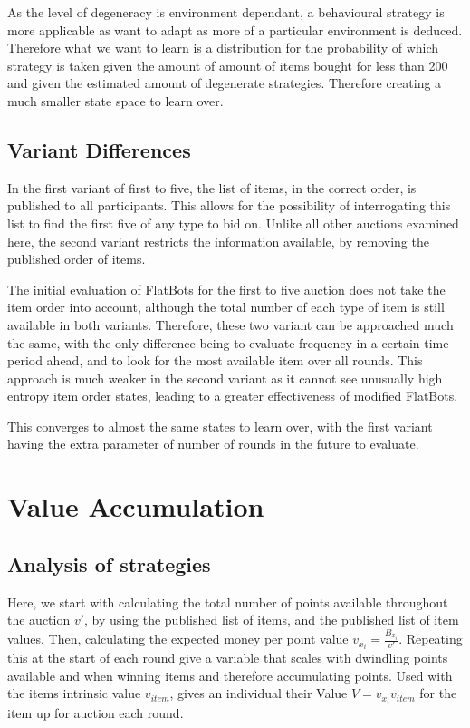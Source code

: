 \documentclass[10pt,conference,twocolumn]{IEEEtran}
\begin{document}
As the level of degeneracy is environment dependant, a behavioural strategy is more applicable as want to adapt as more of a particular environment is deduced. Therefore what we want to learn is a distribution for the probability of which strategy is taken given the amount of amount of items bought for less than 200 and given the estimated amount of degenerate strategies. Therefore creating a much smaller state space to learn over.

\subsection{Variant Differences}
In the first variant of first to five, the list of items, in the correct order, is published to all participants. This allows for the possibility of interrogating this list to find the first five of any type to bid on. Unlike all other auctions examined here, the second variant restricts the information available, by removing the published order of items. 

The initial evaluation of FlatBots for the first to five auction does not take the item order into account, although the total number of each type of item is still available in both variants. Therefore, these two variant can be approached much the same, with the only difference being to evaluate frequency in a certain time period ahead, and to look for the most available item over all rounds. This approach is much weaker in the second variant as it cannot see unusually high entropy item order states, leading to a greater effectiveness of modified FlatBots.

This converges to almost the same states to learn over, with the first variant having the extra parameter of number of rounds in the future to evaluate. 

\section{Value Accumulation}
\subsection{Analysis of strategies}
Here, we start with calculating the total number of points available throughout the auction $v'$, by using the published list of items, and the published list of item values. Then, calculating the expected money per point value $v_{x_i} = \frac{B_{x_i}}{v'}$. Repeating this at the start of each round give a variable that scales with dwindling points available and when winning items and therefore accumulating points. Used with the items intrinsic value $v_{item}$, gives an individual their Value $V=v_{x_i}v_{item}$ for the item up for auction each round.
\end{document}

